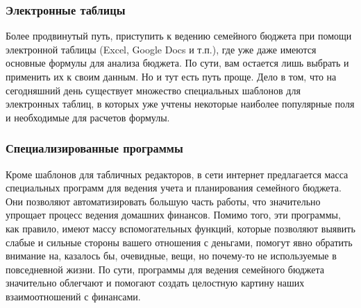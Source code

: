 \subsubsection{Электронные таблицы}
Более продвинутый путь, приступить к ведению семейного бюджета при
помощи электронной таблицы (Excel, Google Docs и т.п.), где уже даже имеются основные формулы для анализа бюджета. По сути, вам остается лишь
выбрать и применить их к своим данным. Но и тут есть путь проще.
Дело в том, что на сегодняшний день существует множество специальных
шаблонов для электронных таблиц, в которых уже учтены некоторые наиболее популярные поля и необходимые для расчетов формулы.
\subsubsection{Специализированные программы}
Кроме шаблонов для табличных редакторов, в сети интернет предлагается
масса специальных программ для ведения учета и планирования семейного
бюджета.
Они позволяют автоматизировать большую часть работы, что значительно
упрощает процесс ведения домашних финансов.
Помимо того, эти программы, как правило, имеют массу вспомогательных функций, которые позволяют выявить слабые и сильные стороны вашего отношения с деньгами, помогут явно обратить внимание на, казалось бы,
очевидные, вещи, но почему-то не используемые в повседневной жизни. По
сути, программы для ведения семейного бюджета значительно облегчают и
помогают создать целостную картину наших взаимоотношений с финансами.
